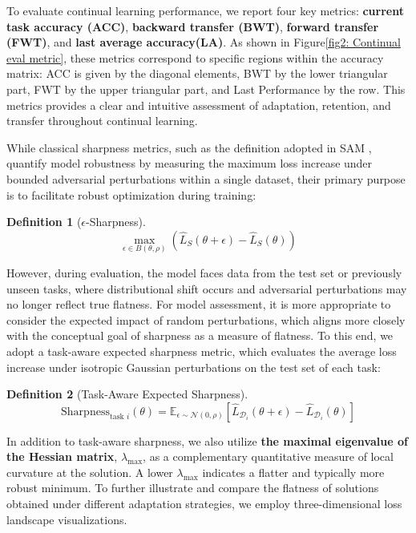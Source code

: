 \documentclass[letterpaper]{article} %
\newtheorem{definition}{Definition}
\begin{document}
To evaluate continual learning performance, we report four key metrics: \textbf{ current task accuracy (ACC)}, \textbf{backward transfer (BWT)}, \textbf{forward transfer (FWT)}, and \textbf{ last average accuracy(LA)}. As shown in Figure\ref{fig2: Continual eval metric}, these metrics correspond to specific regions within the accuracy matrix: ACC is given by the diagonal elements, BWT by the lower triangular part, FWT by the upper triangular part, and Last Performance by the row. This metrics provides a clear and intuitive assessment of adaptation, retention, and transfer throughout continual learning.



While classical sharpness metrics, such as the definition adopted in SAM , quantify model robustness by measuring the maximum loss increase under bounded adversarial perturbations within a single dataset, their primary purpose is to facilitate robust optimization during training:
 \begin{definition}[$\epsilon$-Sharpness]
 \begin{equation}
 \max_{\epsilon \in B(\theta, \rho)}\left(\hat{L}_{S}(\theta+\epsilon)-\hat{L}_{S}(\theta)\right)
 \end{equation}
 \end{definition}
However, during evaluation, the model faces data from the test set or previously unseen tasks, where distributional shift occurs and adversarial perturbations may no longer reflect true flatness. For model assessment, it is more appropriate to consider the expected impact of random perturbations, which aligns more closely with the conceptual goal of sharpness as a measure of flatness. To this end, we adopt a task-aware expected sharpness metric, which evaluates the average loss increase under isotropic Gaussian perturbations on the test set of each task:
 \begin{definition}[Task-Aware Expected Sharpness]\label{def: Task-Aware Expected Sharpness}
 \begin{equation}
 \mathrm{Sharpness}_{\text{task } i}(\theta) = \mathbb{E}_{\epsilon \sim \mathcal{N}(0,\rho)} \left[ \hat{L}_{\mathcal{D}_{i}}(\theta + \epsilon) - \hat{L}_{\mathcal{D}_{i}}(\theta) \right]
 \end{equation}
 \end{definition}


In addition to task-aware sharpness, we also utilize \textbf{the maximal eigenvalue of the Hessian matrix}, $\lambda_{\max}$, as a complementary quantitative measure of local curvature at the solution. A lower $\lambda_{\max}$ indicates a flatter and typically more robust minimum. To further illustrate and compare the flatness of solutions obtained under different adaptation strategies, we employ three-dimensional loss landscape visualizations\cite{liVisualizingLossLandscape2018}.
\end{document}
